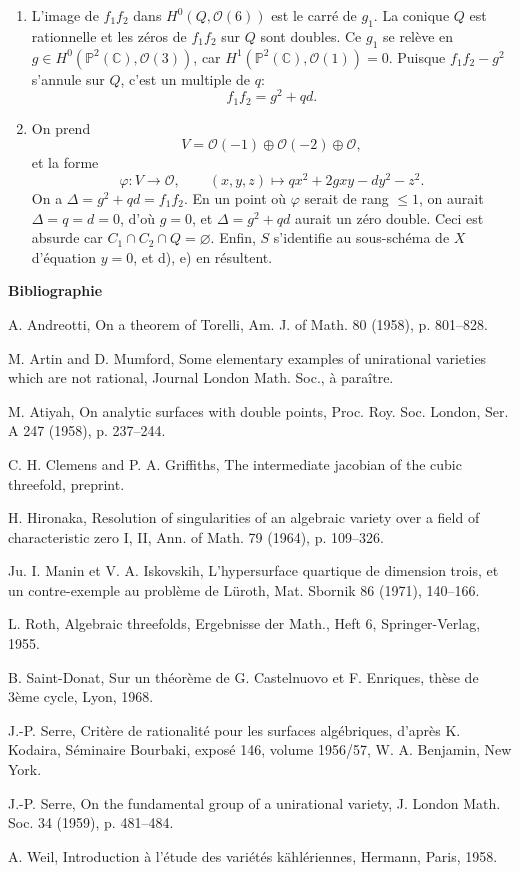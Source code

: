\documentclass[10pt]{article}
\newcommand{\C}{\mathbb C}
\newcommand{\Pj}{\mathbb P}
\begin{document}
\begin{enumerate}[label=\arabic*)]
\item L'image de \(f_1f_2\) dans \(H^0(Q,\mathcal O(6))\) est le carré de \(g_1\). La conique \(Q\) est rationnelle et les zéros de \(f_1f_2\) sur \(Q\) sont doubles. Ce \(g_1\) se relève en \(g\in H^0(\Pj^2(\C),\mathcal O(3))\), car \(H^1(\Pj^2(\C),\mathcal O(1))=0\). Puisque \(f_1f_2-g^2\) s'annule sur \(Q\), c'est un multiple de \(q\):
\[
f_1f_2=g^2+qd.
\]
\item On prend
\[
V=\mathcal O(-1)\oplus\mathcal O(-2)\oplus\mathcal O,
\]
et la forme
\[
\varphi:V\to\mathcal O,
\qquad (x,y,z)\longmapsto qx^2+2gxy-dy^2-z^2.
\]
On a \(\Delta=g^2+qd=f_1f_2\). En un point où \(\varphi\) serait de rang \(\le1\), on aurait \(\Delta=q=d=0\), d'où \(g=0\), et \(\Delta=g^2+qd\) aurait un zéro double. Ceci est absurde car \(C_1\cap C_2\cap Q=\varnothing\). Enfin, \(S\) s'identifie au sous-schéma de \(X\) d'équation \(y=0\), et d), e) en résultent.
\end{enumerate}

\begin{center}\bfseries Bibliographie\end{center}
\begin{enumerate}[label={[\arabic*]}]
\item A. Andreotti, On a theorem of Torelli, Am. J. of Math. 80 (1958), p. 801--828.
\item M. Artin and D. Mumford, Some elementary examples of unirational varieties which are not rational, Journal London Math. Soc., à paraître.
\item M. Atiyah, On analytic surfaces with double points, Proc. Roy. Soc. London, Ser. A 247 (1958), p. 237--244.
\item C. H. Clemens and P. A. Griffiths, The intermediate jacobian of the cubic threefold, preprint.
\item H. Hironaka, Resolution of singularities of an algebraic variety over a field of characteristic zero I, II, Ann. of Math. 79 (1964), p. 109--326.
\item Ju. I. Manin et V. A. Iskovskih, L'hypersurface quartique de dimension trois, et un contre-exemple au problème de Lüroth, Mat. Sbornik 86 (1971), 140--166.
\item L. Roth, Algebraic threefolds, Ergebnisse der Math., Heft 6, Springer-Verlag, 1955.
\item B. Saint-Donat, Sur un théorème de G. Castelnuovo et F. Enriques, thèse de 3ème cycle, Lyon, 1968.
\item J.-P. Serre, Critère de rationalité pour les surfaces algébriques, d'après K. Kodaira, Séminaire Bourbaki, exposé 146, volume 1956/57, W. A. Benjamin, New York.
\item J.-P. Serre, On the fundamental group of a unirational variety, J. London Math. Soc. 34 (1959), p. 481--484.
\item A. Weil, Introduction à l'étude des variétés kählériennes, Hermann, Paris, 1958.
\end{enumerate}
\end{document}
